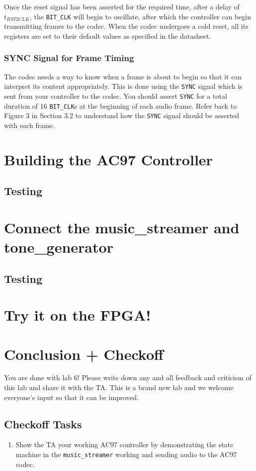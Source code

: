 \documentclass[11pt]{article}
\begin{document}
Once the reset signal has been asserted for the required time, after a delay of $t_{RST2CLK}$, the \verb|BIT_CLK| will begin to oscillate, after which the controller can begin transmitting frames to the codec. When the codec undergoes a cold reset, all its registers are set to their default values as specified in the datasheet.

\subsubsection{SYNC Signal for Frame Timing}
The codec needs a way to know when a frame is about to begin so that it can interpret its content appropriately. This is done using the \verb|SYNC| signal which is sent from your controller to the codec. You should assert \verb|SYNC| for a total duration of 16 \verb|BIT_CLK|s at the beginning of each audio frame. Refer back to Figure 3 in Section 3.2 to understand how the \verb|SYNC| signal should be asserted with each frame.

\section{Building the AC97 Controller}


\subsection{Testing}

\section{Connect the music\_streamer and tone\_generator}

\subsection{Testing}

\section{Try it on the FPGA!}

\section{Conclusion + Checkoff}
You are done with lab 6! Please write down any and all feedback and criticism of this lab and share it with the TA. This is a brand new lab and we welcome everyone's input so that it can be improved.

\subsection{Checkoff Tasks}

\begin{enumerate}
	\item Show the TA your working AC97 controller by demonstrating the state machine in the \verb|music_streamer| working and sending audio to the AC97 codec.
\end{enumerate}
\end{document}
